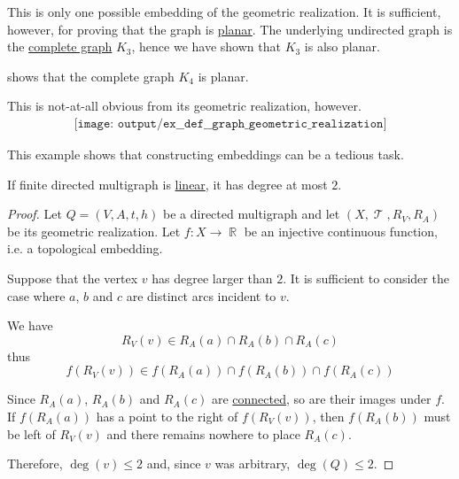 \begin{example}
\begin{thmenum}
    This is only one possible embedding of the geometric realization. It is sufficient, however, for proving that the graph is \hyperref[def:directed_multigraph_geometric_realization/planar]{planar}. The underlying undirected graph is the \hyperref[ex:complete_graph]{complete graph} \( K_3 \), hence we have shown that \( K_3 \) is also planar.

      shows that the complete graph \( K_4 \) is planar.

    This is not-at-all obvious from its geometric realization, however.
    \begin{equation}\label{eq:ex:def:directed_multigraph_geometric_realization/k4/realization}
      \begin{aligned}
        \texttt{[image: output/ex\_\_def\_\_graph\_geometric\_realization]}
      \end{aligned}
    \end{equation}

    This example shows that constructing embeddings can be a tedious task.
  \end{thmenum}
\end{example}

\begin{proposition}\label{thm:linear_directed multigraph_equivalence}
  If finite directed multigraph is \hyperref[def:directed_multigraph_geometric_realization/linear]{linear}, it has degree at most \( 2 \).
\end{proposition}
\begin{proof}
  Let \( Q = (V, A, t, h) \) be a directed multigraph and let \( (X, \mscrT, R_V, R_A) \) be its geometric realization. Let \( f: X \to \BbbR \) be an injective continuous function, i.e. a topological embedding.

  Suppose that the vertex \( v \) has degree larger than \( 2 \). It is sufficient to consider the case where \( a \), \( b \) and \( c \) are distinct arcs incident to \( v \).

  We have
  \begin{equation*}
    R_V(v) \in R_A(a) \cap R_A(b) \cap R_A(c)
  \end{equation*}
  thus
  \begin{equation*}
    f(R_V(v)) \in f(R_A(a)) \cap f(R_A(b)) \cap f(R_A(c))
  \end{equation*}

  Since \( R_A(a) \), \( R_A(b) \) and \( R_A(c) \) are \hyperref[def:connected_space]{connected}, so are their images under \( f \). If \( f(R_A(a)) \) has a point to the right of \( f(R_V(v)) \), then \( f(R_A(b)) \) must be left of \( R_V(v) \) and there remains nowhere to place \( R_A(c) \).

  Therefore, \( \deg(v) \leq 2 \) and, since \( v \) was arbitrary, \( \deg(Q) \leq 2 \).
\end{proof}

